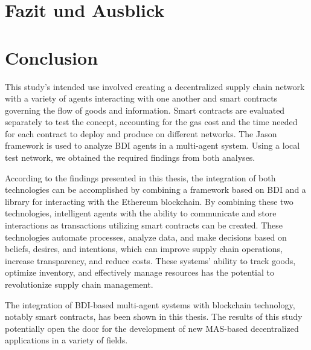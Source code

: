 {\chapter{Fazit und Ausblick}}
{\chapter{Conclusion}}

\label{sec:conclusion}
This study's intended use involved creating a decentralized supply chain network with a variety of agents interacting with one another and smart contracts governing the flow of goods and information. Smart contracts are evaluated separately to test the concept, accounting for the gas cost and the time needed for each contract to deploy and produce on different networks. The Jason framework is used to analyze \ac{BDI} agents in a multi-agent system. Using a local test network, we obtained the required findings from both analyses.
\vspace{.5cm}

According to the findings presented in this thesis, the integration of both technologies can be accomplished by combining a framework based on \ac{BDI} and a library for interacting with the Ethereum blockchain. By combining these two technologies, intelligent agents with the ability to communicate and store interactions as transactions utilizing smart contracts can be created. These technologies automate processes, analyze data, and make decisions based on beliefs, desires, and intentions, which can improve supply chain operations, increase transparency, and reduce costs. These systems' ability to track goods, optimize inventory, and effectively manage resources has the potential to revolutionize supply chain management.

\vspace{.5cm}

The integration of \ac{BDI}-based multi-agent systems with blockchain technology, notably smart contracts, has been shown in this thesis. The results of this study potentially open the door for the development of new \ac{MAS}-based decentralized applications in a variety of fields.


